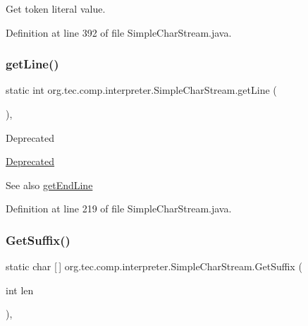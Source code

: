 Get token literal value. 

Definition at line 392 of file Simple\+Char\+Stream.\+java.

\mbox{\label{classorg_1_1tec_1_1comp_1_1interpreter_1_1_simple_char_stream_add3b2680e6ae39ed71962bdf4978fbe3}} 
\subsubsection{\texorpdfstring{get\+Line()}{getLine()}}
{\footnotesize\ttfamily static int org.\+tec.\+comp.\+interpreter.\+Simple\+Char\+Stream.\+get\+Line (\begin{DoxyParamCaption}{ }\end{DoxyParamCaption})\hspace{0.3cm}{\ttfamily [inline]}, {\ttfamily [static]}}

\begin{DoxyRefDesc}{Deprecated}
\item[\mbox{\hyperlink{deprecated__deprecated000002}{Deprecated}}]\end{DoxyRefDesc}
\begin{DoxySeeAlso}{See also}
\mbox{\hyperlink{classorg_1_1tec_1_1comp_1_1interpreter_1_1_simple_char_stream_a9cad3706737ddbb3fafdb9a1aaf50b6f}{get\+End\+Line}} 
\end{DoxySeeAlso}


Definition at line 219 of file Simple\+Char\+Stream.\+java.

\mbox{\label{classorg_1_1tec_1_1comp_1_1interpreter_1_1_simple_char_stream_a6ffe7865f8cf930dbee140a576eceab7}} 
\subsubsection{\texorpdfstring{Get\+Suffix()}{GetSuffix()}}
{\footnotesize\ttfamily static char \mbox{[}$\,$\mbox{]} org.\+tec.\+comp.\+interpreter.\+Simple\+Char\+Stream.\+Get\+Suffix (\begin{DoxyParamCaption}\item[{int}]{len }\end{DoxyParamCaption})\hspace{0.3cm}{\ttfamily [inline]}, {\ttfamily [static]}}

